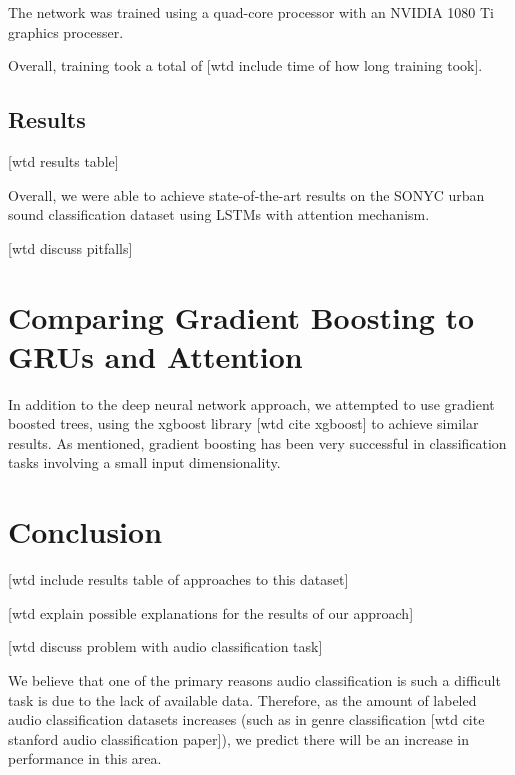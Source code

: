 \documentclass[a4paper,11pt,twoside]{scrbook}
\begin{document}
The network was trained using a quad-core processor with an NVIDIA 1080 Ti graphics processer.

Overall, training took a total of [wtd include time of how long training took].

\section{Results}

[wtd results table]

Overall, we were able to achieve state-of-the-art results on the SONYC urban sound classification dataset using LSTMs with attention mechanism.

[wtd discuss pitfalls]

\chapter{Comparing Gradient Boosting to GRUs and Attention}

In addition to the deep neural network approach, we attempted to use gradient boosted trees, using the xgboost library [wtd cite xgboost] to achieve similar results.  As mentioned, gradient boosting has been very successful in classification tasks involving a small input dimensionality.

\chapter{Conclusion}

[wtd include results table of approaches to this dataset]

[wtd explain possible explanations for the results of our approach]

[wtd discuss problem with audio classification task]

We believe that one of the primary reasons audio classification is such a difficult task is due to the lack of available data.  Therefore, as the amount of labeled audio classification datasets increases (such as in genre classification [wtd cite stanford audio classification paper]), we predict there will be an increase in performance in this area.
\end{document}
